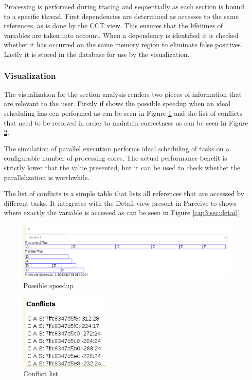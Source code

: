 Processing is performed during tracing and sequentially as each section is bound to a specific thread. First dependencies are determined as accesses to the same references, as is done by the CCT view. This ensures that the lifetimes of variables are taken into account. When a dependency is identified it is checked whether it has occurred on the same memory region to eliminate false positives. Lastly it is stored in the database for use by the visualization.

\subsubsection{Visualization}

The visualization for the section analysis renders two pieces of information that are relevant to the user. Firstly if shows the possible speedup when an ideal scheduling has een performed as can be seen in Figure \ref{cap3:sec:speedup} and the list of conflicts that need to be resolved in order to maintain correctness as can be seen in Figure \ref{cap3:sec:conflict}.

The simulation of parallel execution performs ideal scheduling of tasks on a configurable number of processing cores. The actual performance benefit is strictly lower that the value presented, but it can be used to check whether the parallelization is worthwhile. 

The list of conflicts is a simple table that lists all references that are accessed by different tasks. It integrates with the Detail view present in Parceive to shows where exactly the variable is accessed as can be seen in Figure \ref{cap3:sec:detail}.

\begin{figure}
	\centering
	\includegraphics[width=1\textwidth]{section-speedup}
	\caption{Possible speedup}
	\label{cap3:sec:speedup}
\end{figure}

\begin{figure}
	\centering
	\includegraphics[width=0.4\textwidth]{section-conflict}
	\caption{Conflict list}
	\label{cap3:sec:conflict}
\end{figure}

